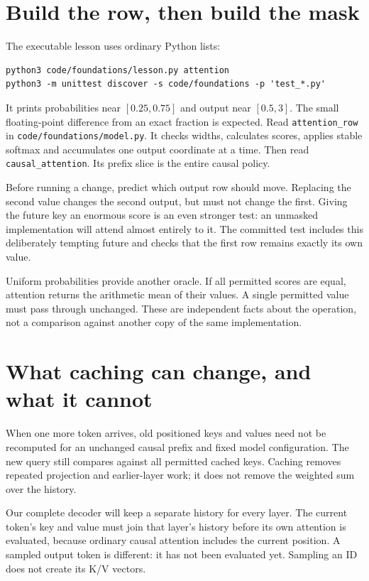 \section{Build the row, then build the mask}
The executable lesson uses ordinary Python lists:
\begin{verbatim}
python3 code/foundations/lesson.py attention
python3 -m unittest discover -s code/foundations -p 'test_*.py'
\end{verbatim}
It prints probabilities near $[0.25,0.75]$ and output near $[0.5,3]$.
The small floating-point difference from an exact fraction is expected.
Read \texttt{attention\_row} in \texttt{code/foundations/model.py}.
It checks widths, calculates scores, applies stable softmax and accumulates
one output coordinate at a time. Then read \texttt{causal\_attention}.
Its prefix slice is the entire causal policy.

Before running a change, predict which output row should move. Replacing
the second value changes the second output, but must not change the first.
Giving the future key an enormous score is an even stronger test: an
unmasked implementation will attend almost entirely to it. The committed
test includes this deliberately tempting future and checks that the first
row remains exactly its own value.

Uniform probabilities provide another oracle. If all permitted scores
are equal, attention returns the arithmetic mean of their values. A
single permitted value must pass through unchanged. These are independent
facts about the operation, not a comparison against another copy of the
same implementation.

\section{What caching can change, and what it cannot}
When one more token arrives, old positioned keys and values need not be
recomputed for an unchanged causal prefix and fixed model configuration.
The new query still compares against all permitted cached keys. Caching
removes repeated projection and earlier-layer work; it does not remove
the weighted sum over the history.

Our complete decoder will keep a separate history for every layer.
The current token's key and value must join that layer's history before
its own attention is evaluated, because ordinary causal attention includes
the current position. A sampled output token is different: it has not
been evaluated yet. Sampling an ID does not create its K/V vectors.

